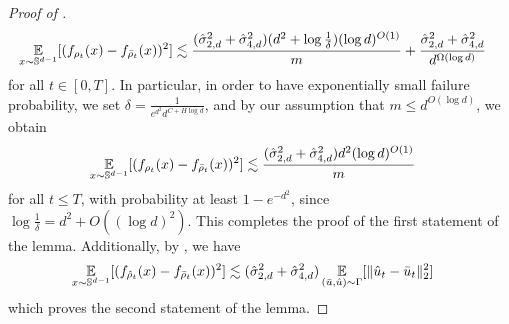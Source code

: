\begin{proof}[Proof of ]
\begin{align}
\operatorname*{\mathbb{E}}_{x \sim \mathbb{S}^{d - 1}} [(f_{\rho_t}(x) - f_{{\bar{\rho}}_t}(x))^2]
& \lesssim \frac{(\hat{\sigma}_{2, d}^2 + \hat{\sigma}_{4, d}^2) (d^2 + \log \frac{1}{\delta}) (\log d)^{O(1)}}{m} + \frac{\hat{\sigma}_{2, d}^2 + \hat{\sigma}_{4, d}^2}{d^{\Omega(\log d)}}
\end{align}
for all $t \in [0, T]$. In particular, in order to have exponentially small failure probability, we set $\delta = \frac{1}{e^{d^2} d^{C + H \log d}}$, and by our assumption that $m \leq d^{O(\log d)}$, we obtain
\begin{align}
\operatorname*{\mathbb{E}}_{x \sim \mathbb{S}^{d - 1}} [(f_{\rho_t}(x) - f_{{\bar{\rho}}_t}(x))^2]
& \lesssim \frac{(\hat{\sigma}_{2, d}^2 + \hat{\sigma}_{4, d}^2) d^2 (\log d)^{O(1)}}{m}
\end{align}
for all $t \leq T$, with probability at least $1 - e^{-d^2}$, since $\log \frac{1}{\delta} = d^2 + O((\log d)^2)$. This completes the proof of the first statement of the lemma. Additionally, by , we have
\begin{align}
\operatorname*{\mathbb{E}}_{x \sim \mathbb{S}^{d - 1}} [(f_{{\hat{\rho}}_t}(x) - f_{{\bar{\rho}}_t}(x))^2]
& \lesssim (\hat{\sigma}_{2, d}^2 + \hat{\sigma}_{4, d}^2) \operatorname*{\mathbb{E}}_{(\bar{u}, \hat{u}) \sim \Gamma} [\|\hat{u}_t - \bar{u}_t\|_2^2]
\end{align}
which proves the second statement of the lemma.
\end{proof}

